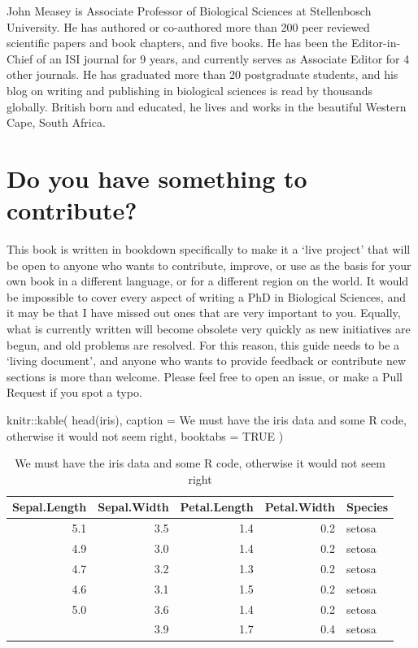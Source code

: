 \documentclass[
]{krantz}
\makeatletter
\newenvironment{Shaded}{\begin{snugshade}}{\end{snugshade}}
\newcommand{\AttributeTok}[1]{\textcolor[rgb]{0.61,0.61,0.61}{#1}}
\newcommand{\ConstantTok}[1]{\textcolor[rgb]{0,0,0}{#1}}
\newcommand{\FunctionTok}[1]{\textcolor[rgb]{0,0,0}{#1}}
\newcommand{\NormalTok}[1]{#1}
\newcommand{\SpecialCharTok}[1]{\textcolor[rgb]{0,0,0}{#1}}
\newcommand{\StringTok}[1]{\textcolor[rgb]{0.5,0.5,0.5}{#1}}
\newenvironment{kframe}{%
\medskip{}
\setlength{\fboxsep}{.8em}
 \def\at@end@of@kframe{}%
 \ifinner\ifhmode%
  \def\at@end@of@kframe{\end{minipage}}%
  \begin{minipage}{\columnwidth}%
 \fi\fi%
 \def\FrameCommand##1{\hskip\@totalleftmargin \hskip-\fboxsep
 \colorbox{shadecolor}{##1}\hskip-\fboxsep
     \hskip-\linewidth \hskip-\@totalleftmargin \hskip\columnwidth}%
 \MakeFramed {\advance\hsize-\width
   \@totalleftmargin\z@ \linewidth\hsize
   \@setminipage}}%
 {\par\unskip\endMakeFramed%
 \at@end@of@kframe}
\renewenvironment{Shaded}{\begin{kframe}}{\end{kframe}}
\makeatother
\begin{document}
John Measey is Associate Professor of Biological Sciences at Stellenbosch University. He has authored or co-authored more than 200 peer reviewed scientific papers and book chapters, and five books. He has been the Editor-in-Chief of an ISI journal for 9 years, and currently serves as Associate Editor for 4 other journals. He has graduated more than 20 postgraduate students, and his blog on writing and publishing in biological sciences is read by thousands globally. British born and educated, he lives and works in the beautiful Western Cape, South Africa.

\hypertarget{contribute}{%
\chapter*{Do you have something to contribute?}\label{contribute}}


This book is written in bookdown \citep{xie2016bookdown} specifically to make it a `live project' that will be open to anyone who wants to contribute, improve, or use as the basis for your own book in a different language, or for a different region on the world. It would be impossible to cover every aspect of writing a PhD in Biological Sciences, and it may be that I have missed out ones that are very important to you. Equally, what is currently written will become obsolete very quickly as new initiatives are begun, and old problems are resolved. For this reason, this guide needs to be a `living document', and anyone who wants to provide feedback or contribute new sections is more than welcome. Please feel free to open an issue, or make a Pull Request if you spot a typo.

\begin{Shaded}
\begin{Highlighting}[]
\NormalTok{knitr}\SpecialCharTok{::}\FunctionTok{kable}\NormalTok{(}
  \FunctionTok{head}\NormalTok{(iris), }\AttributeTok{caption =} \StringTok{\textquotesingle{}We must have the iris data and some R code, otherwise it would not seem right\textquotesingle{}}\NormalTok{,}
  \AttributeTok{booktabs =} \ConstantTok{TRUE}
\NormalTok{)}
\end{Highlighting}
\end{Shaded}

\begin{table}

\caption{\label{tab:iris}We must have the iris data and some R code, otherwise it would not seem right}
\centering
\begin{tabular}[t]{rrrrl}
\toprule
Sepal.Length & Sepal.Width & Petal.Length & Petal.Width & Species\\
\midrule
5.1 & 3.5 & 1.4 & 0.2 & setosa\\
4.9 & 3.0 & 1.4 & 0.2 & setosa\\
4.7 & 3.2 & 1.3 & 0.2 & setosa\\
4.6 & 3.1 & 1.5 & 0.2 & setosa\\
5.0 & 3.6 & 1.4 & 0.2 & setosa\\
\addlinespace
5.4 & 3.9 & 1.7 & 0.4 & setosa\\
\bottomrule
\end{tabular}
\end{table}
\end{document}
